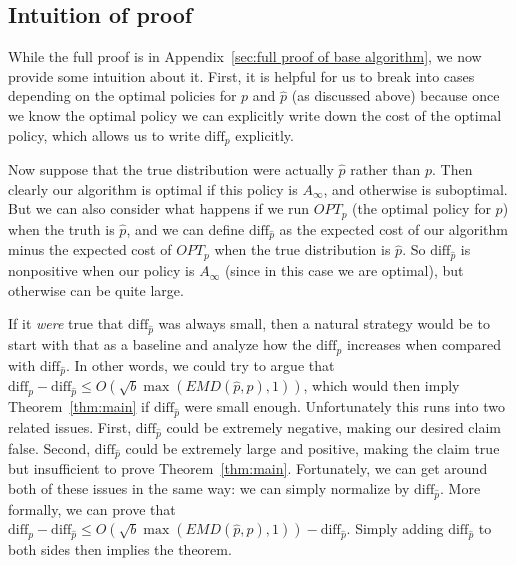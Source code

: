\subsection{Intuition of proof}
\label{sec:intuition of base proof}

While the full proof is in Appendix~\ref{sec:full proof of base algorithm}, we now provide some intuition about it.
First, it is helpful for us to break into cases depending on the optimal policies for $p$ and $\hat p$ (as discussed above) because once we know the optimal policy we can explicitly write down the cost of the optimal policy, which allows us to write $\text{diff}_p$ explicitly.  

Now suppose that the true distribution were actually $\hat p$ rather than $p$.  Then clearly our algorithm is optimal if this policy is $A_{\infty}$, and otherwise is suboptimal.  But we can also consider what happens if we run $OPT_p$ (the optimal policy for $p$) when the truth is $\hat p$, and we can define $\text{diff}_{\hat p}$ as the expected cost of our algorithm minus the expected cost of $OPT_p$ when the true distribution is $\hat p$.  So $\text{diff}_{\hat p}$ is nonpositive when our policy is $A_{\infty}$ (since in this case we are optimal), but otherwise can be quite large.

If it \emph{were} true that $\text{diff}_{\hat p}$ was always small, then a natural strategy would be to start with that as a baseline and analyze how the $\text{diff}_p$ increases when compared with $\text{diff}_{\hat p}$.  In other words, we could try to argue that $\text{diff}_p - \text{diff}_{\hat p} \leq O(\sqrt{b}\max(EMD(\hat{p},p),1))$, which would then imply Theorem~\ref{thm:main} if $\text{diff}_{\hat p}$ were small enough.  Unfortunately this runs into two related issues.  First, $\text{diff}_{\hat p}$ could be extremely negative, making our desired claim false.  Second, $\text{diff}_{\hat p}$ could be extremely large and positive, making the claim true but insufficient to prove Theorem~\ref{thm:main}.  Fortunately, we can get around both of these issues in the same way: we can simply normalize by $\text{diff}_{\hat p}$.  More formally, we can prove that $\text{diff}_p - \text{diff}_{\hat{p}} \leq O(\sqrt{b}\max(EMD(\hat{p},p),1)) - \text{diff}_{\hat{p}}$.  Simply adding $\text{diff}_{\hat p}$ to both sides then implies the theorem.  

